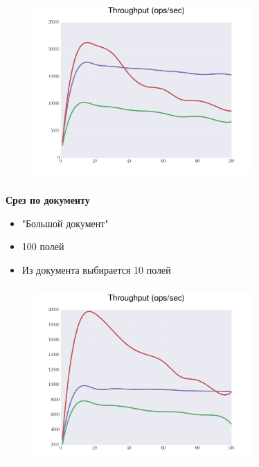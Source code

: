 \documentclass[18pt, compress, aspectratio=169]{beamer}
\begin{document}
\begin{frame}
    \frametitle{}
    \begin{center}
    \begin{figure}
        \includegraphics[width=0.75\textwidth,center]{benchmarks/workload_c_select_one/throughput.png}
    \end{figure}
    \end{center}
\end{frame}

\begin{frame}
    \frametitle{}
    \begin{center}
        \textbf{Срез по документу}
        \begin{itemize}[label={}]
            \item "Большой документ"
            \item 100 полей
            \item Из документа выбирается 10 полей
        \end{itemize}
    \end{center}
\end{frame}

\begin{frame}
    \frametitle{}
    \begin{center}
    \begin{figure}
        \includegraphics[width=0.75\textwidth,center]{benchmarks/workload_c_select_slice/throughput.png}
    \end{figure}
    \end{center}
\end{frame}
\end{document}
